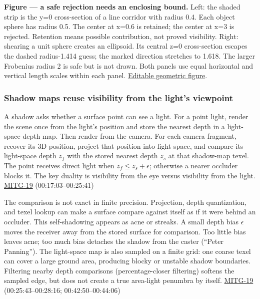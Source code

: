 \textbf{Figure --- a safe rejection needs an enclosing bound.} Left: the shaded strip is the y=0 cross-section of a line corridor with radius 0.4. Each object sphere has radius 0.5. The center at x=0.6 is retained; the center at x=3 is rejected. Retention means possible contribution, not proved visibility. Right: shearing a unit sphere creates an ellipsoid. Its central z=0 cross-section escapes the dashed radius-1.414 guess; the marked direction stretches to 1.618. The larger Frobenius radius 2 is safe but is not drawn. Both panels use equal horizontal and vertical length scales within each panel. \href{Visual\%20Recall/Game\%20Engine/corridor-and-shear.svg}{Editable geometric figure}.

\subsubsection{Shadow maps reuse visibility from the light's viewpoint}\label{shadow-maps-reuse-visibility-from-the-lights-viewpoint}

A shadow asks whether a surface point can see a light. For a point light, render the scene once from the light's position and store the nearest depth in a light-space depth map. Then render from the camera. For each camera fragment, recover its 3D position, project that position into light space, and compare its light-space depth \(z_f\) with the stored nearest depth \(z_s\) at that shadow-map texel. The point receives direct light when \(z_f\le z_s+\epsilon\); otherwise a nearer occluder blocks it. The key duality is visibility from the eye versus visibility from the light. \hyperref[04-visual-computing-ii-ch036]{MITG-19} (00:17:03--00:25:41)

The comparison is not exact in finite precision. Projection, depth quantization, and texel lookup can make a surface compare against itself as if it were behind an occluder. This self-shadowing appears as acne or streaks. A small depth bias \(\epsilon\) moves the receiver away from the stored surface for comparison. Too little bias leaves acne; too much bias detaches the shadow from the caster (``Peter Panning''). The light-space map is also sampled on a finite grid: one coarse texel can cover a large ground area, producing blocky or unstable shadow boundaries. Filtering nearby depth comparisons (percentage-closer filtering) softens the sampled edge, but does not create a true area-light penumbra by itself. \hyperref[04-visual-computing-ii-ch036]{MITG-19} (00:25:43--00:28:16; 00:42:50--00:44:06)

